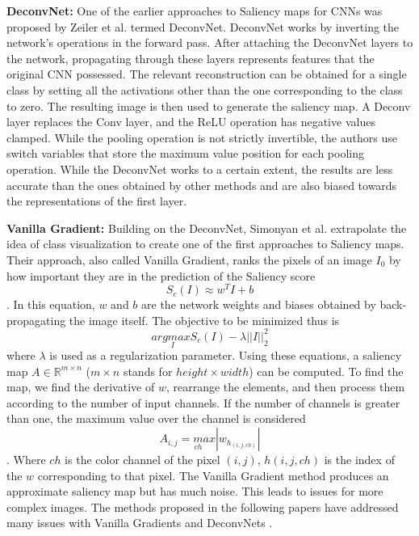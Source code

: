 \documentclass[a4paper,11pt,openright]{book}
\begin{document}
\textbf{DeconvNet: }
One of the earlier approaches to Saliency maps for CNNs was proposed by Zeiler et al. \cite{zeilerVisualizingUnderstandingConvolutional2013} termed DeconvNet. DeconvNet works by inverting the network's operations in the forward pass. After attaching the DeconvNet layers to the network, propagating through these layers represents features that the original CNN possessed. The relevant reconstruction can be obtained for a single class by setting all the activations other than the one corresponding to the class to zero. The resulting image is then used to generate the saliency map. A Deconv layer replaces the Conv layer, and the ReLU operation has negative values clamped. While the pooling operation is not strictly invertible, the authors use switch variables that store the maximum value position for each pooling operation. While the DeconvNet works to a certain extent, the results are less accurate than the ones obtained by other methods and are also biased towards the representations of the first layer.

\textbf{Vanilla Gradient: }
Building on the DeconvNet, Simonyan et al. \cite{simonyanDeepConvolutionalNetworks2014} extrapolate the idea of class visualization to create one of the first approaches to Saliency maps. Their approach, also called Vanilla Gradient, ranks the pixels of an image $I_{0}$ by how important they are in the prediction of the Saliency score $$S_{c}(I) \approx w^{T}I + b$$. In this equation, $w$ and $b$ are the network weights and biases obtained by back-propagating the image itself. The objective to be minimized thus is $$arg \underset{I}max S_{c}(I) - \lambda||I||^{2}_{2}$$ where $\lambda$ is used as a regularization parameter. Using these equations, a saliency map $A \in \mathbb{R}^{m \times n}$ ($m \times n$ stands for $height \times width$) can be computed. To find the map, we find the derivative of $w$, rearrange the elements, and then process them according to the number of input channels. If the number of channels is greater than one, the maximum value over the channel is considered $$A_{i,j}= \underset{ch}max |w_{h_{(i,j, ch)}}|$$. Where $ch$ is the color channel of the pixel $(i,j)$, $h(i,j, ch)$ is the index of the $w$ corresponding to that pixel. The Vanilla Gradient method produces an approximate saliency map but has much noise. This leads to issues for more complex images. The methods proposed in the following papers have addressed many issues with Vanilla Gradients and DeconvNets \cite{zeilerVisualizingUnderstandingConvolutional2013}.
\end{document}
